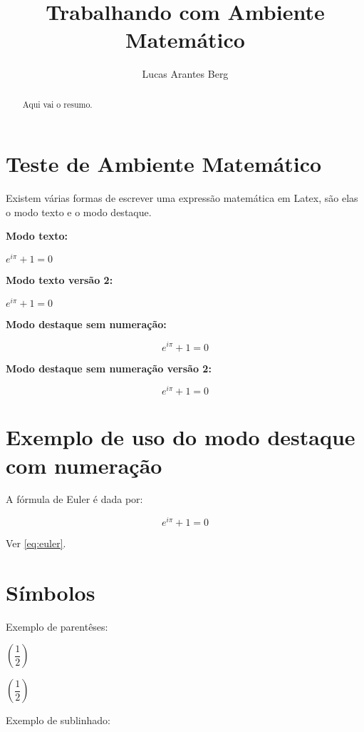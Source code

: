\documentclass[]{article}
\title{Trabalhando com Ambiente Matemático}
\author{Lucas Arantes Berg}
\newcommand{\x}{\dfrac{1}{2}}
\begin{document}
\maketitle

\begin{abstract}
	Aqui vai o resumo.
\end{abstract}

\section{Teste de Ambiente Matemático}

Existem várias formas de escrever uma expressão matemática em Latex, são elas o modo texto e o modo destaque.

\textbf{Modo texto:}

$e^{i \pi} + 1 = 0$


\textbf{Modo texto versão 2:}

\(e^{i \pi} + 1 = 0\)

\textbf{Modo destaque sem numeração:}

\begin{equation*}
	e^{i \pi} + 1 = 0
\end{equation*}

\textbf{Modo destaque sem numeração versão 2:}

\[
e^{i \pi} + 1 = 0
\]

\section{Exemplo de uso do modo destaque com numeração}

A fórmula de Euler é dada por:

\begin{equation} \label{eq:euler}
	e^{i \pi} + 1 = 0
\end{equation}

Ver \eqref{eq:euler}.

\newpage
\section{Símbolos}

Exemplo de parentêses:

$( \x )$

$\left( \x \right)$

Exemplo de sublinhado:
\end{document}
